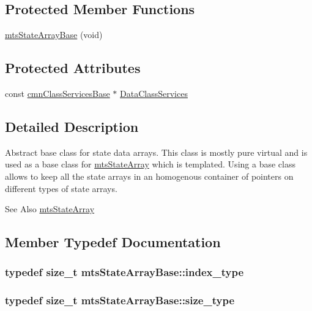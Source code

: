\subsection*{Protected Member Functions}
\begin{DoxyCompactItemize}
\item 
\hyperlink{classmts_state_array_base_aa00e3667f9cc11adf351d6d7cb09fea7}{mts\-State\-Array\-Base} (void)
\end{DoxyCompactItemize}
\subsection*{Protected Attributes}
\begin{DoxyCompactItemize}
\item 
const \hyperlink{classcmn_class_services_base}{cmn\-Class\-Services\-Base} $\ast$ \hyperlink{classmts_state_array_base_abd3be9ad51f2cb1930cddd78cc6f1216}{Data\-Class\-Services}
\end{DoxyCompactItemize}


\subsection{Detailed Description}
Abstract base class for state data arrays. This class is mostly pure virtual and is used as a base class for \hyperlink{classmts_state_array}{mts\-State\-Array} which is templated. Using a base class allows to keep all the state arrays in an homogenous container of pointers on different types of state arrays.

\begin{DoxySeeAlso}{See Also}
\hyperlink{classmts_state_array}{mts\-State\-Array} 
\end{DoxySeeAlso}


\subsection{Member Typedef Documentation}
\hypertarget{classmts_state_array_base_a22ecbf65a907a7550951d12970f3df1d}{
\subsubsection[{index\-\_\-type}]{\setlength{\rightskip}{0pt plus 5cm}typedef size\-\_\-t {\bf mts\-State\-Array\-Base\-::index\-\_\-type}}}\label{classmts_state_array_base_a22ecbf65a907a7550951d12970f3df1d}
\hypertarget{classmts_state_array_base_a2a29f8b24a48620f67c907fc5592fc17}{
\subsubsection[{size\-\_\-type}]{\setlength{\rightskip}{0pt plus 5cm}typedef size\-\_\-t {\bf mts\-State\-Array\-Base\-::size\-\_\-type}}}\label{classmts_state_array_base_a2a29f8b24a48620f67c907fc5592fc17}


